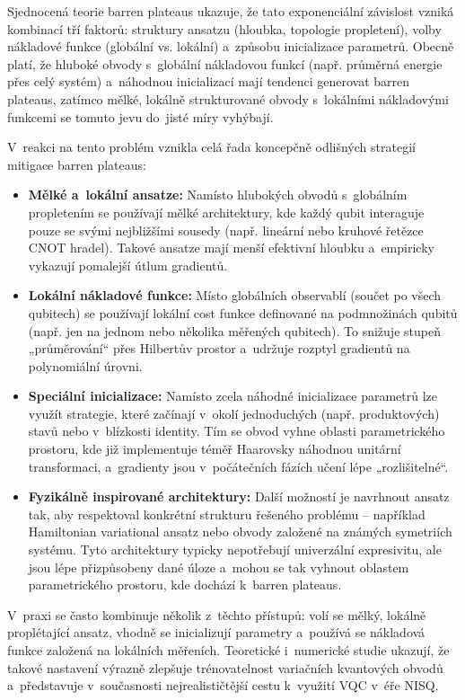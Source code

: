 \documentclass[12pt, a4paper]{report}
\begin{document}
Sjednocená teorie barren plateaus ukazuje, že tato exponenciální závislost vzniká kombinací tří faktorů: struktury ansatzu (hloubka, topologie propletení), volby nákladové funkce (globální vs. lokální) a~způsobu inicializace parametrů. Obecně platí, že hluboké obvody s~globální nákladovou funkcí (např. průměrná energie přes celý systém) a~náhodnou inicializací mají tendenci generovat barren plateaus, zatímco mělké, lokálně strukturované obvody s~lokálními nákladovými funkcemi se tomuto jevu do~jisté míry vyhýbají.

V~reakci na tento problém vznikla celá řada koncepčně odlišných strategií mitigace barren plateaus:

\begin{itemize}
    \item \textbf{Mělké a~lokální ansatze:} Namísto hlubokých obvodů s~globálním propletením se používají mělké architektury, kde každý qubit interaguje pouze se svými nejbližšími sousedy (např. lineární nebo kruhové řetězce CNOT hradel). Takové ansatze mají menší efektivní hloubku a~empiricky vykazují pomalejší útlum gradientů.
    \item \textbf{Lokální nákladové funkce:} Místo globálních observablí (součet po všech qubitech) se používají lokální cost funkce definované na podmnožinách qubitů (např. jen na jednom nebo několika měřených qubitech). To snižuje stupeň „průměrování“ přes Hilbertův prostor a~udržuje rozptyl gradientů na polynomiální úrovni.
    \item \textbf{Speciální inicializace:} Namísto zcela náhodné inicializace parametrů lze využít strategie, které začínají v~okolí jednoduchých (např. produktových) stavů nebo v~blízkosti identity. Tím se obvod vyhne oblasti parametrického prostoru, kde již implementuje téměř Haarovsky náhodnou unitární transformaci, a~gradienty jsou v~počátečních fázích učení lépe „rozlišitelné“.
    \item \textbf{Fyzikálně inspirované architektury:} Další možností je navrhnout ansatz tak, aby respektoval konkrétní strukturu řešeného problému – například Hamiltonian variational ansatz nebo obvody založené na známých symetriích systému. Tyto architektury typicky nepotřebují univerzální expresivitu, ale jsou lépe přizpůsobeny dané úloze a~mohou se tak vyhnout oblastem parametrického prostoru, kde dochází k~barren plateaus.
\end{itemize}

V~praxi se často kombinuje několik z~těchto přístupů: volí se mělký, lokálně proplétající ansatz, vhodně se inicializují parametry a~používá se nákladová funkce založená na lokálních měřeních. Teoretické i~numerické studie ukazují, že takové nastavení výrazně zlepšuje trénovatelnost variačních kvantových obvodů a~představuje v~současnosti nejrealističtější cestu k~využití VQC v~éře NISQ.
\end{document}

